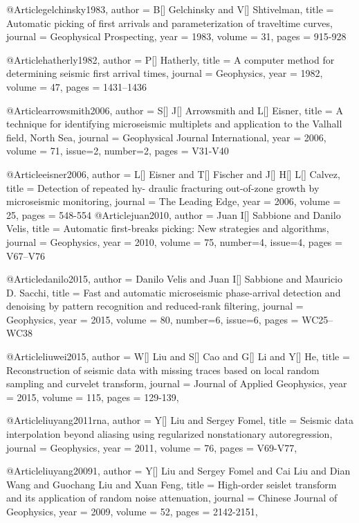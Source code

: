     @Article{gelchinsky1983,
  author = 	 {B[] Gelchinsky and V[] Shtivelman},
  title = 	 {Automatic picking of first arrivals and parameterization of traveltime curves},
  journal = 	 {Geophysical Prospecting},
  year = 	 1983,
  volume = 	 31,
  pages = 	 {915-928}} 

    @Article{hatherly1982,
  author = 	 {P[] Hatherly},
  title = 	 {A computer method for determining seismic first arrival times},
  journal = 	 {Geophysics},
  year = 	 1982,
  volume = 	 47,
  pages = 	 {1431–1436}} 
    
   @Article{arrowsmith2006,
  author = 	 {S[] J[] Arrowsmith and L[] Eisner},
  title = 	 {A technique for identifying microseismic multiplets and application to the Valhall field, North Sea},
  journal = 	 {Geophysical Journal International},
  year = 	 2006,
  volume = 	 71,
  issue=2,
  number=2,
  pages = 	 {V31-V40}} 
  
    @Article{eisner2006,
  author = 	 {L[] Eisner and T[] Fischer and J[] H[] L[] Calvez},
  title = 	 {Detection of repeated hy- draulic fracturing  out-of-zone growth  by microseismic monitoring},
  journal = 	 {The Leading Edge},
  year = 	 2006,
  volume = 	 25,
  pages = 	 {548-554}}
    @Article{juan2010,
  author = 	 {Juan I[] Sabbione and Danilo Velis},
  title = 	 {Automatic first-breaks picking: New strategies and algorithms},
  journal = 	 {Geophysics},
  year = 	 2010,
  volume = 	 75,
  number=4,
  issue=4,
  pages = 	 {V67–V76}} 
  
      @Article{danilo2015,
  author = 	 {Danilo Velis and Juan I[] Sabbione and Mauricio D. Sacchi},
  title = 	 {Fast and automatic microseismic phase-arrival detection and denoising by pattern recognition and reduced-rank filtering},
  journal = 	 {Geophysics},
  year = 	 2015,
  volume = 	 80,
  number=6,
  issue=6,
  pages = 	 {WC25–WC38}} 
  
  
@Article{liuwei2015,
  author = 	 {W[] Liu and S[] Cao and G[] Li and Y[] He},
  title = 	 {Reconstruction of seismic data with missing traces based on local random sampling and curvelet transform},
  journal = 	 {Journal of Applied Geophysics},
  year = 	 2015,
  volume = 115,
  pages =	 {129-139},
}

@Article{liuyang2011rna,
  author = 	 {Y[] Liu and Sergey Fomel},
  title = 	 {Seismic data interpolation beyond aliasing using regularized nonstationary autoregression},
  journal = 	 {Geophysics},
  year = 	 2011,
  volume =	 76,
  pages =	 {V69-V77},
}

@Article{liuyang20091,
  author = 	 {Y[] Liu and Sergey Fomel and Cai Liu and Dian Wang and Guochang Liu and Xuan Feng},
  title = 	 {High-order seislet transform and its application of random noise attenuation},
  journal = 	 {Chinese Journal of Geophysics},
  year = 	 2009,
  volume =	 52,
  pages =	 {2142-2151},
}


